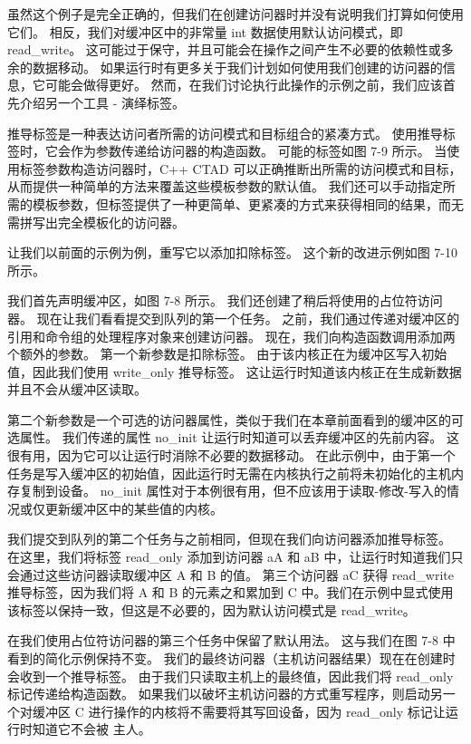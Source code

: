 虽然这个例子是完全正确的，但我们在创建访问器时并没有说明我们打算如何使用它们。 相反，我们对缓冲区中的非常量 int 数据使用默认访问模式，即 read\_write。 这可能过于保守，并且可能会在操作之间产生不必要的依赖性或多余的数据移动。 如果运行时有更多关于我们计划如何使用我们创建的访问器的信息，它可能会做得更好。 然而，在我们讨论执行此操作的示例之前，我们应该首先介绍另一个工具 - 演绎标签。

推导标签是一种表达访问者所需的访问模式和目标组合的紧凑方式。 使用推导标签时，它会作为参数传递给访问器的构造函数。 可能的标签如图 7-9 所示。 当使用标签参数构造访问器时，C++ CTAD 可以正确推断出所需的访问模式和目标，从而提供一种简单的方法来覆盖这些模板参数的默认值。 我们还可以手动指定所需的模板参数，但标签提供了一种更简单、更紧凑的方式来获得相同的结果，而无需拼写出完全模板化的访问器。

让我们以前面的示例为例，重写它以添加扣除标签。 这个新的改进示例如图 7-10 所示。

我们首先声明缓冲区，如图 7-8 所示。 我们还创建了稍后将使用的占位符访问器。 现在让我们看看提交到队列的第一个任务。 之前，我们通过传递对缓冲区的引用和命令组的处理程序对象来创建访问器。 现在，我们向构造函数调用添加两个额外的参数。 第一个新参数是扣除标签。 由于该内核正在为缓冲区写入初始值，因此我们使用 write\_only 推导标签。 这让运行时知道该内核正在生成新数据并且不会从缓冲区读取。

第二个新参数是一个可选的访问器属性，类似于我们在本章前面看到的缓冲区的可选属性。 我们传递的属性 no\_init 让运行时知道可以丢弃缓冲区的先前内容。 这很有用，因为它可以让运行时消除不必要的数据移动。 在此示例中，由于第一个任务是写入缓冲区的初始值，因此运行时无需在内核执行之前将未初始化的主机内存复制到设备。 no\_init 属性对于本例很有用，但不应该用于读取-修改-写入的情况或仅更新缓冲区中的某些值的内核。

我们提交到队列的第二个任务与之前相同，但现在我们向访问器添加推导标签。 在这里，我们将标签 read\_only 添加到访问器 aA 和 aB 中，让运行时知道我们只会通过这些访问器读取缓冲区 A 和 B 的值。 第三个访问器 aC 获得 read\_write 推导标签，因为我们将 A 和 B 的元素之和累加到 C 中。我们在示例中显式使用该标签以保持一致，但这是不必要的，因为默认访问模式是 read\_write。

在我们使用占位符访问器的第三个任务中保留了默认用法。 这与我们在图 7-8 中看到的简化示例保持不变。 我们的最终访问器（主机访问器结果）现在在创建时会收到一个推导标签。 由于我们只读取主机上的最终值，因此我们将 read\_only 标记传递给构造函数。 如果我们以破坏主机访问器的方式重写程序，则启动另一个对缓冲区 C 进行操作的内核将不需要将其写回设备，因为 read\_only 标记让运行时知道它不会被 主人。

